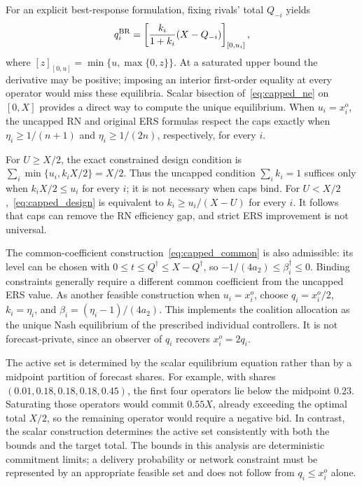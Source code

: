 \documentclass[journal]{IEEEtran}
\begin{document}
For an explicit best-response formulation, fixing rivals' total $Q_{-i}$ yields
\begin{equation}
 q_i^{\rm BR}=\left[\frac{k_i}{1+k_i}(X-Q_{-i})\right]_{[0,u_i]},
 \label{eq:capped_br}
\end{equation}
where $[z]_{[0,u]}=\min\{u,\max\{0,z\}\}$. At a saturated upper bound the derivative may be positive; imposing an interior first-order equality at every operator would miss these equilibria. Scalar bisection of~\eqref{eq:capped_ne} on $[0,X]$ provides a direct way to compute the unique equilibrium. When $u_i=x_i^o$, the uncapped RN and original ERS formulas respect the caps exactly when $\eta_i\geq1/(n+1)$ and $\eta_i\geq1/(2n)$, respectively, for every $i$.

For $U\geq X/2$, the exact constrained design condition is
$\sum_i\min\{u_i,k_iX/2\}=X/2$.
Thus the uncapped condition $\sum_i k_i=1$ suffices only when $k_iX/2\leq u_i$ for every $i$; it is not necessary when caps bind. For $U<X/2$,~\eqref{eq:capped_design} is equivalent to $k_i\geq u_i/(X-U)$ for every $i$. It follows that caps can remove the RN efficiency gap, and strict ERS improvement is not universal.

The common-coefficient construction~\eqref{eq:capped_common} is also admissible: its level can be chosen with $0\leq t\leq Q^\dagger\leq X-Q^\dagger$, so $-1/(4a_2)\leq\beta_i^\dagger\leq0$. Binding constraints generally require a different common coefficient from the uncapped ERS value. As another feasible construction when $u_i=x_i^o$, choose $q_i=x_i^o/2$, $k_i=\eta_i$, and $\beta_i=(\eta_i-1)/(4a_2)$. This implements the coalition allocation as the unique Nash equilibrium of the prescribed individual controllers. It is not forecast-private, since an observer of $q_i$ recovers $x_i^o=2q_i$.

The active set is determined by the scalar equilibrium equation rather than by a midpoint partition of forecast shares. For example, with shares $(0.01,0.18,0.18,0.18,0.45)$, the first four operators lie below the midpoint $0.23$. Saturating those operators would commit $0.55X$, already exceeding the optimal total $X/2$, so the remaining operator would require a negative bid. In contrast, the scalar construction determines the active set consistently with both the bounds and the target total. The bounds in this analysis are deterministic commitment limits; a delivery probability or network constraint must be represented by an appropriate feasible set and does not follow from $q_i\leq x_i^o$ alone.
\end{document}
